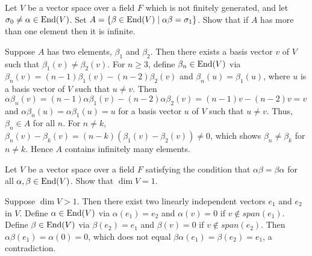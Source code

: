 \begin{problem}[Golan 338]
Let $V$ be a vector space over a field $F$ which is not finitely generated, and
let $\sigma_0 \neq \alpha \in \operatorname{End}(V)$.  Set 
$A = \{\beta \in \operatorname{End}(V) \mid \alpha \beta = \sigma_1\}$.  Show that if $A$ has
more than one element then it is infinite.
\end{problem}
\smallskip
\begin{solution}

Suppose $A$ has two elements, $\beta_1$ and $\beta_2$. Then there exists a basis 
vector $v$ of $V$ such that $\beta_1(v) \ne \beta_2(v)$. For $n \ge 3$, define 
$\beta_n \in \operatorname{End}(V)$ via $\beta_n(v)=(n-1)\beta_1(v)-(n-2)\beta_2(v)$ and 
$\beta_n(u)=\beta_1(u)$, where $u$ is a basis vector of $V$ such that $u \ne v$. 
Then $\alpha\beta_n(v)=(n-1)\alpha\beta_1(v)-(n-2)\alpha\beta_2(v)=(n-1)v-(n-2)v=v$ 
and $\alpha\beta_n(u)=\alpha\beta_1(u)=u$ for a basis vector $u$ of $V$ such that 
$u \ne v$. Thus, $\beta_n \in A$ for all $n$. 
For $n \ne k$, $\beta_n(v)-\beta_k(v)=(n-k)(\beta_1(v)-\beta_2(v)) \ne 0$, which 
shows $\beta_n \ne \beta_k$ for $n \ne k$. Hence $A$ contains infinitely many elements.

\end{solution}

\probskip

\begin{problem}[Golan 340]
Let $V$ be a vector space over a field $F$ satisfying the condition that
$\alpha\beta = \beta\alpha$ for all $\alpha, \beta \in \operatorname{End}(V)$. Show that
$\dim{V} = 1$.
\end{problem}
\smallskip
\begin{solution}

Suppose $\dim{V}>1$. Then there exist two linearly independent vectors $e_1$ and 
$e_2$ in $V$. Define $\alpha \in \operatorname{End}(V)$ via $\alpha(e_1)=e_2$ and $\alpha(v)=0$ 
if $v \notin span(e_1)$. Define $\beta \in \operatorname{End}(V)$ via $\beta(e_2)=e_1$ and 
$\beta(v)=0$ if $v \notin span(e_2)$. Then $\alpha\beta(e_1)=\alpha(0)=0$, which 
does not equal $\beta\alpha(e_1)=\beta(e_2)=e_1$, a contradiction.

\end{solution}

\probskip

